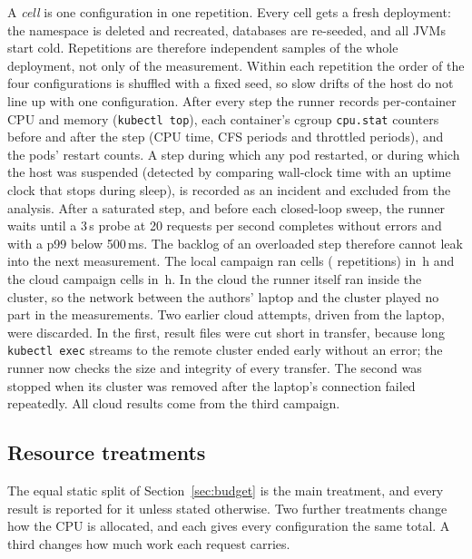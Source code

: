 A \emph{cell} is one configuration in one repetition. Every cell gets a fresh deployment: the namespace is
deleted and recreated, databases are re-seeded, and all JVMs start cold. Repetitions are therefore independent
samples of the whole deployment, not only of the measurement. Within each repetition the order of the four
configurations is shuffled with a fixed seed, so slow drifts of the host do not line up with one configuration.
After every step the runner records per-container CPU and memory (\texttt{kubectl top}), each container's
cgroup \texttt{cpu.stat} counters before and after the step (CPU time, CFS periods and throttled periods), and
the pods' restart counts. A step during which any pod restarted, or during which the host was suspended (detected by
comparing wall-clock time with an uptime clock that stops during sleep), is recorded as an incident and excluded from
the analysis. After a saturated step, and before each closed-loop sweep, the runner waits until a 3\,s probe at 20
requests per second completes without errors and with a p99 below 500\,ms. The backlog of an overloaded step
therefore cannot leak into the next measurement. The local campaign ran  cells ( repetitions) in \,h and the cloud campaign
 cells in \,h. In the cloud the runner itself ran inside the cluster, so the network
between the authors' laptop and the cluster played no part in the measurements. Two earlier cloud attempts, driven
from the laptop, were discarded. In the first, result files were cut short in transfer, because long
\texttt{kubectl exec} streams to the remote cluster ended early without an error; the runner now checks the size
and integrity of every transfer. The second was stopped when its cluster was removed after the laptop's connection
failed repeatedly. All cloud results come from the third campaign.

\subsection{Resource treatments}
\label{sec:treatments}

The equal static split of Section~\ref{sec:budget} is the main treatment, and every result is reported for it
unless stated otherwise. Two further treatments change how the CPU is allocated, and each gives every configuration the same total. A
third changes how much work each request carries.


